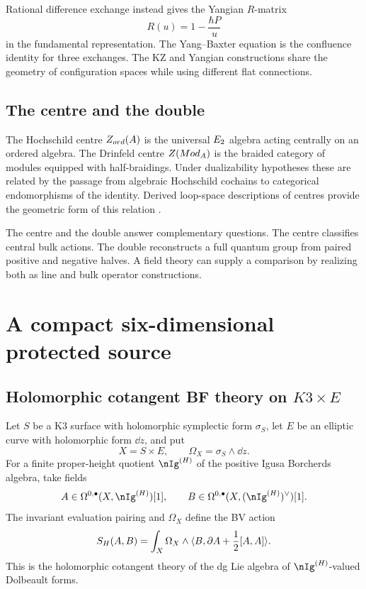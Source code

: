 Rational difference exchange instead gives the Yangian $R$-matrix
\[
 R(u)=1-\frac{\hbar P}{u}
\]
in the fundamental representation. The Yang--Baxter equation is the confluence identity for three exchanges. The KZ and Yangian constructions share the geometry of configuration spaces while using different flat connections.

\chapter{The centre and the double}
The Hochschild centre $Z_{ord}(A)$ is the universal $E_2$ algebra acting centrally on an ordered algebra. The Drinfeld centre $Z(Mod_A)$ is the braided category of modules equipped with half-braidings. Under dualizability hypotheses these are related by the passage from algebraic Hochschild cochains to categorical endomorphisms of the identity. Derived loop-space descriptions of centres provide the geometric form of this relation \cite{BenZviFrancisNadler}.

The centre and the double answer complementary questions. The centre classifies central bulk actions. The double reconstructs a full quantum group from paired positive and negative halves. A field theory can supply a comparison by realizing both as line and bulk operator constructions.


\part{A compact six-dimensional protected source}

\chapter{Holomorphic cotangent BF theory on \texorpdfstring{$K3\times E$}{K3 x E}}
Let $S$ be a K3 surface with holomorphic symplectic form $\sigma_S$, let $E$ be an elliptic curve with holomorphic form $\dd z$, and put
\[
 X=S\times E,
 \qquad
 \Omega_X=\sigma_S\wedge\dd z.
\]
For a finite proper-height quotient $\nIg^{(H)}$ of the positive Igusa Borcherds algebra, take fields
\[
 A\in\Omega^{0,\bullet}(X,\nIg^{(H)})[1],
 \qquad
 B\in\Omega^{0,\bullet}(X,(\nIg^{(H)})^\vee)[1].
\]
The invariant evaluation pairing and $\Omega_X$ define the BV action
\begin{equation}\label{eq:vol4-compact-hbf}
 S_H(A,B)=
 \int_X\Omega_X\wedge
 \langle B,\partial A+\frac12[A,A]\rangle.
\end{equation}
This is the holomorphic cotangent theory of the dg Lie algebra of $\nIg^{(H)}$-valued Dolbeault forms.

